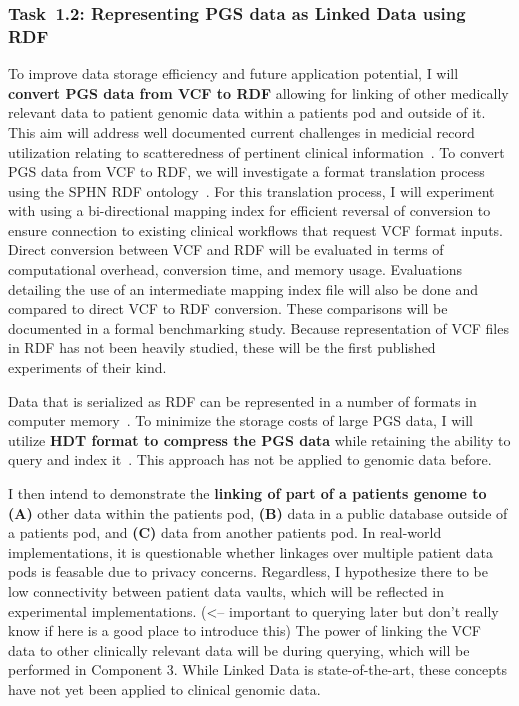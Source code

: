 \documentclass[a4paper,11pt]{article}
\begin{document}
\begin{refsection}
\newcommand\WPab{Representing PGS data as Linked Data using RDF}
\subsubsection{Task~1.2: \WPab}

To improve data storage efficiency and future application potential, I will \textbf{convert PGS data from VCF to RDF} allowing for linking of other medically relevant data to patient genomic data within a patient\textquotesingle s pod and outside of it.
This aim will address well documented current challenges in medicial record utilization relating to scatteredness of pertinent clinical information~\cite{pastorino_benefits_2019}.
To convert PGS data from VCF to RDF, we will investigate a format translation process using the SPHN RDF ontology~\cite{van_der_horst_bridging_2023}. 
For this translation process, I will experiment with using a bi-directional mapping index for efficient reversal of conversion to ensure connection to existing clinical workflows that request VCF format inputs. 
Direct conversion between VCF and RDF will be evaluated in terms of computational overhead, conversion time, and memory usage.
Evaluations detailing the use of an intermediate mapping index file will also be done and compared to direct VCF to RDF conversion. 
These comparisons will be documented in a formal benchmarking study.
Because representation of VCF files in RDF has not been heavily studied, these will be the first published experiments of their kind.

Data that is serialized as RDF can be represented in a number of formats in computer memory~\cite{rdf_serializations}.
To minimize the storage costs of large PGS data, I will utilize \textbf{HDT format to compress the PGS data} while retaining the ability to query and index it~\cite{hdt}.
This approach has not be applied to genomic data before.

I then intend to demonstrate the \textbf{linking of part of a patient\textquotesingle s genome to}
\textbf{(A)} other data within the patient\textquotesingle s pod, 
\textbf{(B)} data in a public database outside of a patient\textquotesingle s pod, and
\textbf{(C)} data from another patient\textquotesingle s pod.
In real-world implementations, it is questionable whether linkages over multiple patient data pods is feasable due to privacy concerns.
Regardless, I hypothesize there to be low connectivity between patient data vaults, which will be reflected in experimental implementations. (<-- important to querying later but don't really know if here is a good place to introduce this)
The power of linking the VCF data to other clinically relevant data will be during querying, which will be performed in Component 3.
While Linked Data is state-of-the-art, these concepts have not yet been applied to clinical genomic data.



\end{refsection}
\end{document}
